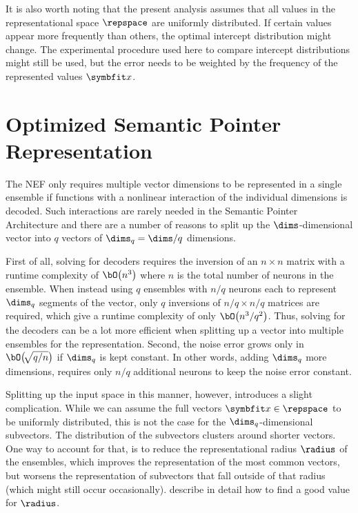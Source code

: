 It is also worth noting that the present analysis assumes that all values in the representational space $\repspace$ are uniformly distributed.
If certain values appear more frequently than others, the optimal intercept distribution might change.
The experimental procedure used here to compare intercept distributions might still be used, but the error needs to be weighted by the frequency of the represented values $\vc x$.


\section{Optimized Semantic Pointer Representation}
The NEF only requires multiple vector dimensions to be represented in a single ensemble if functions with a nonlinear interaction of the individual dimensions is decoded.
Such interactions are rarely needed in the Semantic Pointer Architecture and there are a number of reasons to split up the $\dims$-dimensional vector into $q$ vectors of $\dims_q = \dims / q$ dimensions.

First of all, solving for decoders requires the inversion of an $n \times n$ matrix with a runtime complexity of $\bO\bigl(n^3\bigr)$ where $n$ is the total number of neurons in the ensemble.
When instead using $q$ ensembles with $n/q$ neurons each to represent $\dims_q$ segments of the vector, only $q$ inversions of $n/q \times n/q$ matrices are required, which give a runtime complexity of only $\bO\bigl(n^3/q^2\bigr)$.
Thus, solving for the decoders can be a lot more efficient when splitting up a vector into multiple ensembles for the representation.
Second, the noise error grows only in $\bO\bigl(\!\sqrt{q/n}\bigr)$ if $\dims_q$ is kept constant.
In other words, adding $\dims_q$ more dimensions, requires only $n/q$ additional neurons to keep the noise error constant.

Splitting up the input space in this manner, however, introduces a slight complication.
While we can assume the full vectors $\vc x \in \repspace$ to be uniformly distributed, this is not the case for the $\dims_q$-dimensional subvectors.
The distribution of the subvectors clusters around shorter vectors.
One way to account for that, is to reduce the representational radius $\radius$ of the ensembles, which improves the representation of the most common vectors, but worsens the representation of subvectors that fall outside of that radius (which might still occur occasionally).
\Textcite{gosmann216} describe in detail how to find a good value for $\radius$.

